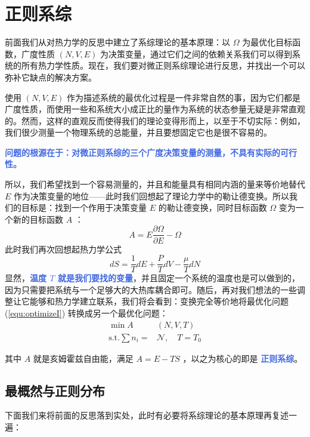 
\chapter{正则系综}\label{cha:正则系综}

前面我们从对热力学的反思中建立了系综理论的基本原理：以 $\Omega$ 为最优化目标函数，广度性质 $(N,V,E)$ 为决策变量，通过它们之间的依赖关系我们可以得到系统的所有热力学性质。现在，我们要对微正则系综理论进行反思，并找出一个可以弥补它缺点的解决方案。

使用 $(N,V,E)$ 作为描述系统的最优化过程是一件非常自然的事，因为它们都是广度性质，而使用一些和系统大小成正比的量作为系统的状态参量无疑是非常直观的。然而，这样的直观反而使得我们的理论变得形而上，以至于不切实际：例如，我们很少测量一个物理系统的总能量，并且要想固定它也是很不容易的。

\textcolor{RoyalBlue}{\textbf{\kaishu 问题的根源在于：对微正则系综的三个广度决策变量的测量，不具有实际的可行性。}}  

所以，我们希望找到一个容易测量的，并且和能量具有相同内涵的量来等价地替代 $E$ 作为决策变量的地位——此时我们回想起了理论力学中的勒让德变换。所以我们的目标是：找到一个作用于决策变量 $E$ 的勒让德变换，同时目标函数 $\Omega$ 变为一个新的目标函数 $A$ ：
\[
    A = E\frac{\partial \Omega}{\partial E} - \Omega
\]
此时我们再次回想起热力学公式
\[
    dS = \frac{1}{T} dE + \frac{P}{T} dV - \frac{\mu}{T} dN
\]
显然，\textcolor{RoyalBlue}{\textbf{\kaishu 温度 $T$ 就是我们要找的变量}}，并且固定一个系统的温度也是可以做到的，因为只需要把系统与一个足够大的大热库耦合即可。随后，再对我们想法的一些调整让它能够和热力学建立联系，我们将会看到：变换完全等价地将最优化问题 (\ref*{equ:optimizeI}) 转换成另一个最优化问题：
\begin{equation}\label{equ:optimizeII}
    \begin{split}
        \min A&(N,V,T)\\
        \text{s.t.}\sum n_i = &\mathcal{N},\quad T = T_0
    \end{split}
\end{equation}

其中 $A$ 就是亥姆霍兹自由能，满足 $A = E - TS$ ，以之为核心的即是 \textcolor{RoyalBlue}{\textbf{\kaishu 正则系综}}。

\section{最概然与正则分布}\label{sec:最概然与正则分布}

下面我们来将前面的反思落到实处，此时有必要将系综理论的基本原理再复述一遍：

